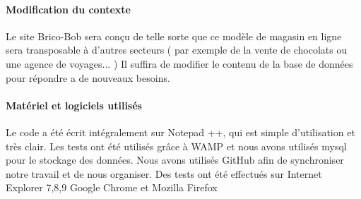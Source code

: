 \paragraph{Modification du contexte}
	
Le site Brico-Bob sera conçu de telle sorte que ce modèle de magasin en ligne sera transposable à d'autres secteurs ( par exemple de la vente de chocolats ou  une agence de voyages... ) Il suffira de modifier le contenu de la base de données pour répondre a de nouveaux besoins.

\paragraph{Matériel et logiciels utilisés}
	
Le code a été écrit intégralement sur Notepad ++, qui est simple d'utilisation et très clair.
Les tests ont été utilisés grâce à WAMP et nous avons utilisés mysql pour le stockage des données.
Nous avons utilisés GitHub afin de synchroniser notre travail et de nous organiser.
Des tests ont été effectués sur Internet Explorer 7,8,9 Google Chrome et Mozilla Firefox
